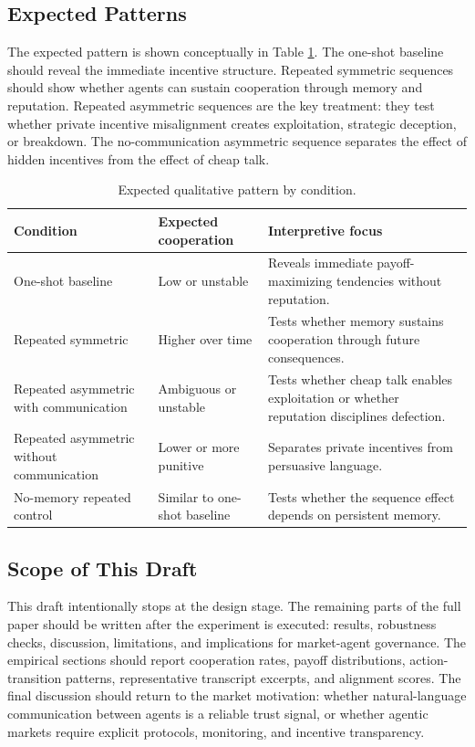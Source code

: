 \documentclass[12pt,a4paper]{article}
\begin{document}
\subsection{Expected Patterns}

The expected pattern is shown conceptually in Table \ref{tab:expected}. The one-shot baseline should reveal the immediate incentive structure. Repeated symmetric sequences should show whether agents can sustain cooperation through memory and reputation. Repeated asymmetric sequences are the key treatment: they test whether private incentive misalignment creates exploitation, strategic deception, or breakdown. The no-communication asymmetric sequence separates the effect of hidden incentives from the effect of cheap talk.

\begin{table}[h!]
\centering
\caption{Expected qualitative pattern by condition.}
\label{tab:expected}
\begin{tabular}{p{} p{} p{}}
\toprule
\textbf{Condition} & \textbf{Expected cooperation} & \textbf{Interpretive focus} \\
\midrule
One-shot baseline & Low or unstable & Reveals immediate payoff-maximizing tendencies without reputation. \\
Repeated symmetric & Higher over time & Tests whether memory sustains cooperation through future consequences. \\
Repeated asymmetric with communication & Ambiguous or unstable & Tests whether cheap talk enables exploitation or whether reputation disciplines defection. \\
Repeated asymmetric without communication & Lower or more punitive & Separates private incentives from persuasive language. \\
No-memory repeated control & Similar to one-shot baseline & Tests whether the sequence effect depends on persistent memory. \\
\bottomrule
\end{tabular}
\end{table}

\subsection{Scope of This Draft}

This draft intentionally stops at the design stage. The remaining parts of the full paper should be written after the experiment is executed: results, robustness checks, discussion, limitations, and implications for market-agent governance. The empirical sections should report cooperation rates, payoff distributions, action-transition patterns, representative transcript excerpts, and alignment scores. The final discussion should return to the market motivation: whether natural-language communication between agents is a reliable trust signal, or whether agentic markets require explicit protocols, monitoring, and incentive transparency.

\newpage


\end{document}
